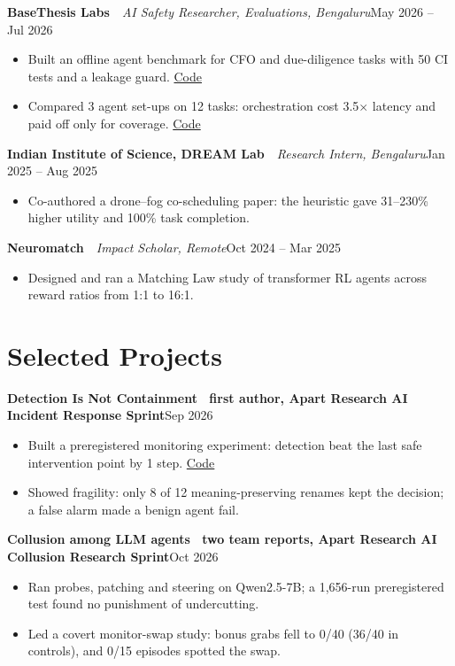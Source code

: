 \documentclass[10pt,a4paper]{article}
\newcommand{\job}[3]{\textbf{#1}\ \textendash\ \textit{#2}\hfill #3\par}
\newcommand{\entry}[2]{\textbf{#1}\hfill #2\par}
\newcommand{\link}[2]{\href{#1}{\color{accent}#2}}
\begin{document}
\job{BaseThesis Labs}{AI Safety Researcher, Evaluations, Bengaluru}{May 2026 -- Jul 2026}
\begin{itemize}
  \item Built an offline agent benchmark for CFO and due-diligence tasks with 50 CI tests and a leakage guard. \link{https://github.com/GaganaMD/synth-benchmark-public}{Code}
  \item Compared 3 agent set-ups on 12 tasks: orchestration cost 3.5$\times$ latency and paid off only for coverage. \link{https://github.com/GaganaMD/benchmark_hermes-fabric-public}{Code}
\end{itemize}

\job{Indian Institute of Science, DREAM Lab}{Research Intern, Bengaluru}{Jan 2025 -- Aug 2025}
\begin{itemize}
  \item Co-authored a drone--fog co-scheduling paper: the heuristic gave 31--230\% higher utility and 100\% task completion.
\end{itemize}

\job{Neuromatch}{Impact Scholar, Remote}{Oct 2024 -- Mar 2025}
\begin{itemize}
  \item Designed and ran a Matching Law study of transformer RL agents across reward ratios from 1:1 to 16:1.
\end{itemize}

\section{Selected Projects}

\entry{Detection Is Not Containment \textmd{\textendash\ first author, Apart Research AI Incident Response Sprint}}{Sep 2026}
\begin{itemize}
  \item Built a preregistered monitoring experiment: detection beat the last safe intervention point by 1 step. \link{https://github.com/GaganaMD/detection-is-not-containment}{Code}
  \item Showed fragility: only 8 of 12 meaning-preserving renames kept the decision; a false alarm made a benign agent fail.
\end{itemize}

\entry{Collusion among LLM agents \textmd{\textendash\ two team reports, Apart Research AI Collusion Research Sprint}}{Oct 2026}
\begin{itemize}
  \item Ran probes, patching and steering on Qwen2.5-7B; a 1,656-run preregistered test found no punishment of undercutting.
  \item Led a covert monitor-swap study: bonus grabs fell to 0/40 (36/40 in controls), and 0/15 episodes spotted the swap.
\end{itemize}
\end{document}
